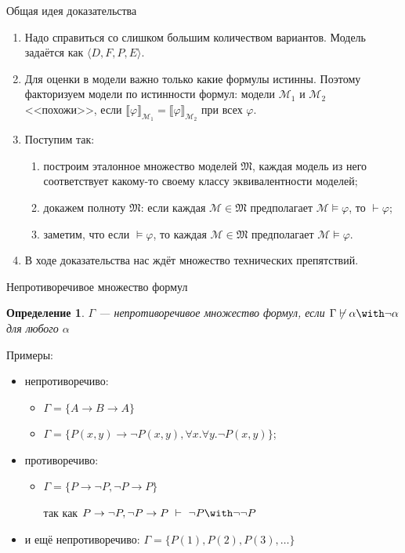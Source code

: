 \documentclass[aspectratio=169]{beamer}
\newtheorem{dfn}{Определение}[section]
\begin{document}
\begin{frame}{Общая идея доказательства}
\begin{enumerate}
\item Надо справиться со слишком большим количеством вариантов.
      Модель задаётся как $\langle D,F,P,E \rangle$.\pause
\item Для оценки в модели важно только какие формулы истинны. Поэтому факторизуем модели по истинности формул:
      модели $\mathcal{M}_1$ и $\mathcal{M}_2$ <<похожи>>, если
      $\llbracket \varphi \rrbracket_{\mathcal{M}_1} = \llbracket \varphi \rrbracket_{\mathcal{M}_2}$
      при всех $\varphi$.\pause
\item Поступим так:
    \begin{enumerate}
       \item построим эталонное множество моделей $\mathfrak{M}$, каждая модель из него соответствует какому-то своему классу эквивалентности моделей;\pause
       \item докажем полноту $\mathfrak{M}$: если каждая $\mathcal{M} \in \mathfrak{M}$ предполагает $\mathcal{M}\models\varphi$,
             то $\vdash\varphi$;\pause
       \item заметим, что если $\models\varphi$, то каждая $\mathcal{M} \in \mathfrak{M}$ предполагает $\mathcal{M}\models\varphi$.\pause
    \end{enumerate}
\item В ходе доказательства нас ждёт множество технических препятствий.
\end{enumerate}
\end{frame}

\begin{frame}{Непротиворечивое множество формул}
\begin{dfn}$\Gamma$ --- \emph{непротиворечивое множество формул},
если $\Gamma\not\vdash\alpha\with\neg\alpha$ для любого $\alpha$
\end{dfn}\pause

Примеры:
\begin{itemize}
\item непротиворечиво: \begin{itemize}
\item $\Gamma = \{A \rightarrow B \rightarrow A\}$\pause
\item $\Gamma = \{P(x,y)\rightarrow\neg P(x,y), \forall x.\forall y.\neg P(x,y)\}$;
\end{itemize}\pause
\item противоречиво: \begin{itemize}
\item $\Gamma = \{P\rightarrow\neg P, \neg P \rightarrow P\}$

так как
$P\rightarrow\neg P, \neg P \rightarrow P \ \vdash\  \neg P \with \neg\neg P$\pause
\end{itemize}
\item и ещё непротиворечиво: $\Gamma = \{P(1), P(2), P(3), \dots\}$
\end{itemize}
\end{frame}
\end{document}

